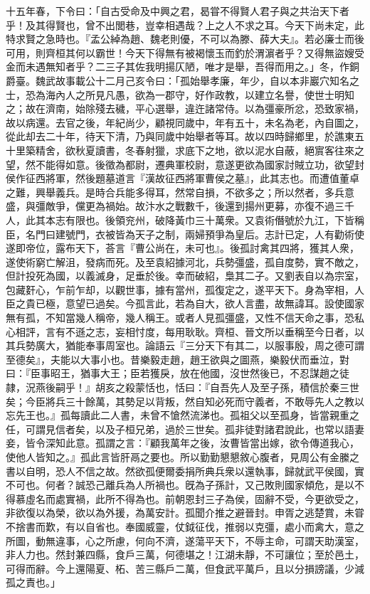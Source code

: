 \begin{pinyinscope}
十五年春，下令曰：「自古受命及中興之君，曷甞不得賢人君子與之共治天下者乎！及其得賢也，曾不出閭巷，豈幸相遇哉？上之人不求之耳。今天下尚未定，此特求賢之急時也。『孟公綽為趙、魏老則優，不可以為滕、薛大夫』。若必廉士而後可用，則齊桓其何以霸世！今天下得無有被褐懷玉而釣於渭濵者乎？又得無盜嫂受金而未遇無知者乎？二三子其佐我明揚仄陋，唯才是舉，吾得而用之。」冬，作銅爵臺。魏武故事載公十二月己亥令曰：「孤始舉孝廉，年少，自以本非巖穴知名之士，恐為海內人之所見凡愚，欲為一郡守，好作政教，以建立名譽，使世士明知之；故在濟南，始除殘去穢，平心選舉，違迕諸常侍。以為彊豪所忿，恐致家禍，故以病還。去官之後，年紀尚少，顧視同歲中，年有五十，未名為老，內自圖之，從此却去二十年，待天下清，乃與同歲中始舉者等耳。故以四時歸鄉里，於譙東五十里築精舍，欲秋夏讀書，冬春射獵，求底下之地，欲以泥水自蔽，絕賔客往來之望，然不能得如意。後徵為都尉，遷典軍校尉，意遂更欲為國家討賊立功，欲望封侯作征西將軍，然後題墓道言『漢故征西將軍曹侯之墓』，此其志也。而遭值董卓之難，興舉義兵。是時合兵能多得耳，然常自損，不欲多之；所以然者，多兵意盛，與彊敵爭，儻更為禍始。故汴水之戰數千，後還到揚州更募，亦復不過三千人，此其本志有限也。後領兖州，破降黃巾三十萬衆。又袁術僭號於九江，下皆稱臣，名門曰建號門，衣被皆為天子之制，兩婦預爭為皇后。志計已定，人有勸術使遂即帝位，露布天下，荅言『曹公尚在，未可也』。後孤討禽其四將，獲其人衆，遂使術窮亡解沮，發病而死。及至袁紹據河北，兵勢彊盛，孤自度勢，實不敵之，但計投死為國，以義滅身，足垂於後。幸而破紹，梟其二子。又劉表自以為宗室，包藏姧心，乍前乍却，以觀世事，據有當州，孤復定之，遂平天下。身為宰相，人臣之貴已極，意望已過矣。今孤言此，若為自大，欲人言盡，故無諱耳。設使國家無有孤，不知當幾人稱帝，幾人稱王。或者人見孤彊盛，又性不信天命之事，恐私心相評，言有不遜之志，妄相忖度，每用耿耿。齊桓、晉文所以垂稱至今日者，以其兵勢廣大，猶能奉事周室也。論語云『三分天下有其二，以服事殷，周之德可謂至德矣』，夫能以大事小也。昔樂毅走趙，趙王欲與之圖燕，樂毅伏而垂泣，對曰：『臣事昭王，猶事大王；臣若獲戾，放在他國，沒世然後已，不忍謀趙之徒隷，況燕後嗣乎！』胡亥之殺蒙恬也，恬曰：『自吾先人及至子孫，積信於秦三世矣；今臣將兵三十餘萬，其勢足以背叛，然自知必死而守義者，不敢辱先人之教以忘先王也。』孤每讀此二人書，未曾不愴然流涕也。孤祖父以至孤身，皆當親重之任，可謂見信者矣，以及子桓兄弟，過於三世矣。孤非徒對諸君說此，也常以語妻妾，皆令深知此意。孤謂之言：『顧我萬年之後，汝曹皆當出嫁，欲令傳道我心，使他人皆知之。』孤此言皆肝鬲之要也。所以勤勤懇懇敘心腹者，見周公有金縢之書以自明，恐人不信之故。然欲孤便爾委捐所典兵衆以還執事，歸就武平侯國，實不可也。何者？誠恐己離兵為人所禍也。旣為子孫計，又己敗則國家傾危，是以不得慕虛名而處實禍，此所不得為也。前朝恩封三子為侯，固辭不受，今更欲受之，非欲復以為榮，欲以為外援，為萬安計。孤聞介推之避晉封。申胥之逃楚賞，未甞不捨書而歎，有以自省也。奉國威靈，仗鉞征伐，推弱以克彊，處小而禽大，意之所圖，動無違事，心之所慮，何向不濟，遂蕩平天下，不辱主命，可謂天助漢室，非人力也。然封兼四縣，食戶三萬，何德堪之！江湖未靜，不可讓位；至於邑土，可得而辭。今上還陽夏、柘、苦三縣戶二萬，但食武平萬戶，且以分損謗議，少減孤之責也。」


\end{pinyinscope}
